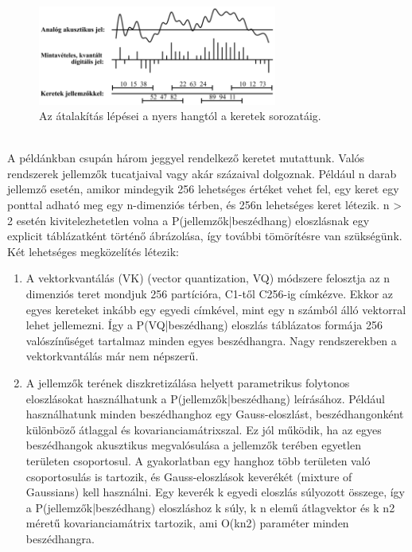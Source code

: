 \documentclass[a4paper,12pt]{paper}
\begin{document}
\begin{figure}[h]
	\centering
	\includegraphics[width=0.7\textwidth]{folyamat2}
	\caption{Az átalakítás lépései a nyers hangtól a keretek sorozatáig.
	}
\end{figure}
\\A példánkban csupán három jeggyel rendelkező keretet mutattunk. Valós rendszerek jellemzők tucatjaival vagy akár százaival dolgoznak. Például n darab jellemző esetén, amikor mindegyik 256 lehetséges értéket vehet fel, egy keret egy ponttal adható meg egy n-dimenziós térben, és 256n lehetséges keret létezik. n > 2 esetén kivitelezhetetlen volna a P(jellemzők|beszédhang) eloszlásnak egy explicit táblázatként történő ábrázolása, így további tömörítésre van szükségünk. Két lehetséges megközelítés létezik:

	\begin{enumerate}
		\item	A vektorkvantálás (VK) (vector quantization, VQ) módszere felosztja az n dimenziós teret mondjuk 256 partícióra, C1-től C256-ig címkézve. Ekkor az egyes kereteket inkább egy egyedi címkével, mint egy n számból álló vektorral lehet jellemezni. Így a P(VQ|beszédhang) eloszlás táblázatos formája 256 valószínűséget tartalmaz minden egyes beszédhangra. Nagy rendszerekben a vektorkvantálás már nem népszerű.
		\item A jellemzők terének diszkretizálása helyett parametrikus folytonos eloszlásokat használhatunk a P(jellemzők|beszédhang) leírásához. Például használhatunk minden beszédhanghoz egy Gauss-eloszlást, beszédhangonként különböző átlaggal és kovarianciamátrixszal. Ez jól működik, ha az egyes beszédhangok akusztikus megvalósulása a jellemzők terében egyetlen területen csoportosul. A gyakorlatban egy hanghoz több területen való csoportosulás is tartozik, és Gauss-eloszlások keverékét (mixture of Gaussians) kell használni. Egy keverék k egyedi eloszlás súlyozott összege, így a P(jellemzők|beszédhang) eloszláshoz k súly, k n elemű átlagvektor és k n2 méretű kovarianciamátrix tartozik, ami O(kn2) paraméter minden beszédhangra.
	\end{enumerate}
\end{document}
